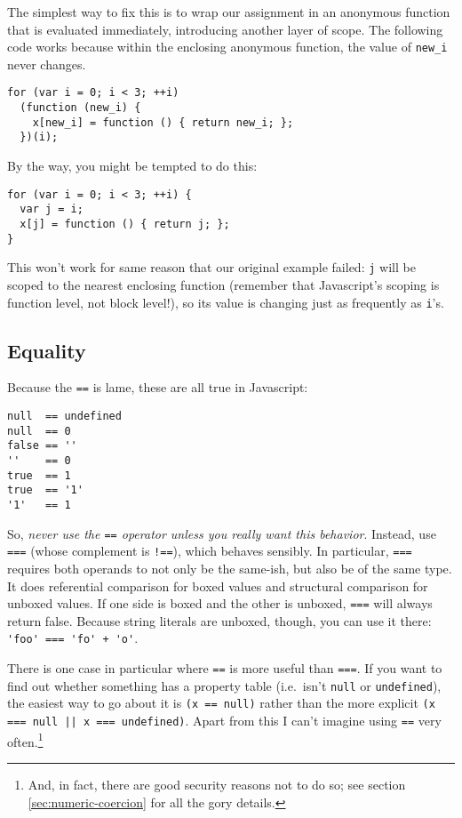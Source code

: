 \documentclass{article}
\begin{document}
    The simplest way to fix this is to wrap our assignment in an anonymous function that is evaluated immediately, introducing another layer of scope. The following code works because within
    the enclosing anonymous function, the value of \verb|new_i| never changes.

\begin{verbatim}
for (var i = 0; i < 3; ++i)
  (function (new_i) {
    x[new_i] = function () { return new_i; };
  })(i);
\end{verbatim}

    By the way, you might be tempted to do this:

\begin{verbatim}
for (var i = 0; i < 3; ++i) {
  var j = i;
  x[j] = function () { return j; };
}
\end{verbatim}

    This won't work for same reason that our original example failed: \verb|j| will be scoped to the nearest enclosing function (remember that Javascript's scoping is function level, not block
    level!), so its value is changing just as frequently as \verb|i|'s.

\subsection {Equality}
    Because the \verb|==| is lame, these are all true in Javascript:

\begin{verbatim}
null  == undefined
null  == 0
false == ''
''    == 0
true  == 1
true  == '1'
'1'   == 1
\end{verbatim}

    So, {\it never use the {\tt ==} operator unless you really want this behavior}. Instead, use \verb|===| (whose complement is \verb|!==|), which behaves sensibly. In particular, \verb|===|
    requires both operands to not only be the same-ish, but also be of the same type. It does referential comparison for boxed values and structural comparison for unboxed values. If one side
    is boxed and the other is unboxed, \verb|===| will always return false. Because string literals are unboxed, though, you can use it there: \verb|'foo' === 'fo' + 'o'|.

    There is one case in particular where {\tt ==} is more useful than {\tt ===}. If you want to find out whether something has a property table (i.e.~isn't {\tt null} or {\tt undefined}), the
    easiest way to go about it is {\tt (x == null)} rather than the more explicit \verb+(x === null || x === undefined)+. Apart from this I can't imagine using {\tt ==} very
    often.\footnote{And, in fact, there are good security reasons not to do so; see section \ref{sec:numeric-coercion} for all the gory details.}
\end{document}
